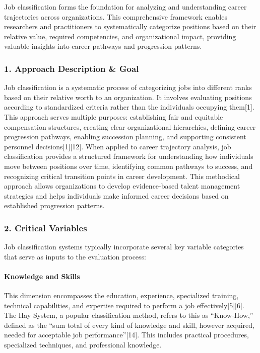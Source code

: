 \documentclass[./main.tex]{subfiles}
\begin{document}
Job classification forms the foundation for analyzing and understanding
career trajectories across organizations. This comprehensive framework
enables researchers and practitioners to systematically categorize
positions based on their relative value, required competencies, and
organizational impact, providing valuable insights into career pathways
and progression patterns.

\subsubsection{1. Approach Description \&
Goal}\label{approach-description-goal}

Job classification is a systematic process of categorizing jobs into
different ranks based on their relative worth to an organization. It
involves evaluating positions according to standardized criteria rather
than the individuals occupying them{[}1{]}. This approach serves
multiple purposes: establishing fair and equitable compensation
structures, creating clear organizational hierarchies, defining career
progression pathways, enabling succession planning, and supporting
consistent personnel decisions{[}1{]}{[}12{]}. When applied to career
trajectory analysis, job classification provides a structured framework
for understanding how individuals move between positions over time,
identifying common pathways to success, and recognizing critical
transition points in career development. This methodical approach allows
organizations to develop evidence-based talent management strategies and
helps individuals make informed career decisions based on established
progression patterns.

\subsubsection{2. Critical Variables}\label{critical-variables}

Job classification systems typically incorporate several key variable
categories that serve as inputs to the evaluation process:

\paragraph{Knowledge and Skills}\label{knowledge-and-skills}

This dimension encompasses the education, experience, specialized
training, technical capabilities, and expertise required to perform a
job effectively{[}5{]}{[}6{]}. The Hay System, a popular classification
method, refers to this as ``Know-How,'' defined as the ``sum total of
every kind of knowledge and skill, however acquired, needed for
acceptable job performance''{[}14{]}. This includes practical
procedures, specialized techniques, and professional knowledge.
\end{document}
